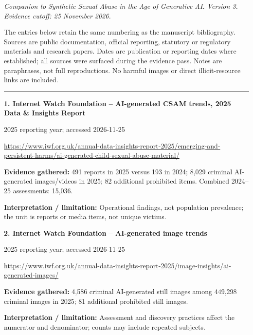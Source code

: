 \documentclass[11pt,a4paper]{article}
\begin{document}
\par\vspace{3mm}
\textit{Companion to Synthetic Sexual Abuse in the Age of Generative AI. Version 3. Evidence cutoff: 25 November 2026.}\par
The entries below retain the same numbering as the manuscript bibliography. Sources are public documentation, official reporting, statutory or regulatory materials and research papers. Dates are publication or reporting dates where established; all sources were surfaced during the evidence pass. Notes are paraphrases, not full reproductions. No harmful images or direct illicit-resource links are included.\par\hrule\vspace{3mm}
\noindent\begin{minipage}{\linewidth}\textbf{1. Internet Watch Foundation -- AI-generated CSAM trends, 2025 Data \& Insights Report}\par{\small 2025 reporting year; accessed 2026-11-25\par\url{https://www.iwf.org.uk/annual-data-insights-report-2025/emerging-and-persistent-harms/ai-generated-child-sexual-abuse-material/}}\par
\textbf{Evidence gathered:} 491 reports in 2025 versus 193 in 2024; 8,029 criminal AI-generated images/videos in 2025; 82 additional prohibited items. Combined 2024--25 assessments: 15,036.\par\textbf{Interpretation / limitation:} Operational findings, not population prevalence; the unit is reports or media items, not unique victims.\par
\end{minipage}\par\vspace{2mm}
\noindent\begin{minipage}{\linewidth}\textbf{2. Internet Watch Foundation -- AI-generated image trends}\par{\small 2025 reporting year; accessed 2026-11-25\par\url{https://www.iwf.org.uk/annual-data-insights-report-2025/image-insights/ai-generated-images/}}\par
\textbf{Evidence gathered:} 4,586 criminal AI-generated still images among 449,298 criminal images in 2025; 81 additional prohibited still images.\par\textbf{Interpretation / limitation:} Assessment and discovery practices affect the numerator and denominator; counts may include repeated subjects.\par
\end{minipage}\par\vspace{2mm}
\end{document}
